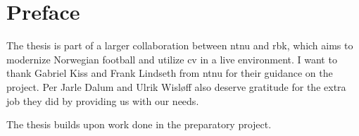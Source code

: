 \chapter*{Preface}

The thesis is part of a larger collaboration between \acrfull{ntnu} and \acrfull{rbk}, which aims to modernize Norwegian football and utilize \acrfull{cv} in a live environment. I want to thank Gabriel Kiss and Frank Lindseth from \acrshort{ntnu} for their guidance on the project. Per Jarle Dalum and Ulrik Wisløff also deserve gratitude for the extra job they did by providing us with our needs. 

The thesis builds upon work done in the preparatory project. 